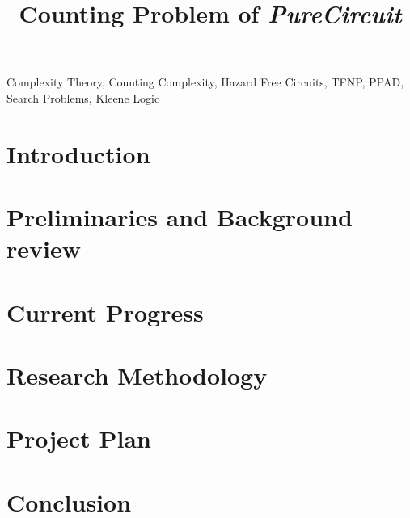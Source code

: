 \documentclass[onecolumn]{IEEEtran}
\begin{document}
\title{Counting Problem of \textit{PureCircuit}}

\author{
}

\maketitle

\begin{abstract}

\end{abstract}

\begin{IEEEkeywords} %
    Complexity Theory, Counting Complexity, Hazard Free Circuits, TFNP, PPAD, Search Problems, Kleene Logic
\end{IEEEkeywords}

\section{Introduction}


\section{Preliminaries and Background review}


\section{Current Progress}


\section{Research Methodology} 


\section{Project Plan} 


\section{Conclusion} 

    


\end{document}
